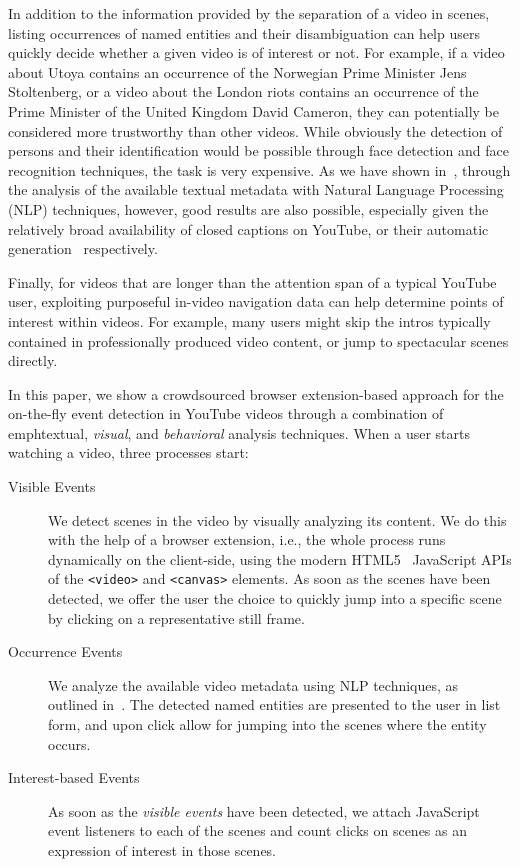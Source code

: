 \documentclass[runningheads,a4paper]{llncs}
\begin{document}
In addition to the information provided by the separation of a video in scenes, listing occurrences of named entities and their disambiguation can help users quickly decide whether a given video is of interest or not. For example, if a video about Utoya contains an occurrence of the Norwegian Prime Minister Jens Stoltenberg, or a video about the London riots contains an occurrence of the Prime Minister of the United Kingdom David Cameron, they can potentially be considered more trustworthy than other videos. While obviously the detection of persons and their identification would be possible through face detection and face recognition techniques, the task is very expensive. As we have shown in~\cite{semwebvid}, through the analysis of the available textual metadata with Natural Language Processing (NLP) techniques, however, good results are also possible, especially given the relatively broad availability of closed captions on YouTube, or their automatic generation~\cite{youtubecaptions} respectively.

Finally, for videos that are longer than the attention span of a typical YouTube user, exploiting purposeful in-video navigation data can help determine points of interest within videos. For example, many users might skip the intros typically contained in professionally produced video content, or jump to spectacular scenes directly. 

In this paper, we show a crowdsourced browser extension-based  approach for the on-the-fly event detection in YouTube videos through a combination of emph{textual}, \emph{visual}, and \emph{behavioral} analysis techniques. When a user starts watching a video, three processes start:
\begin{description}
\item[Visible Events] We detect scenes in the video by visually analyzing its content. We do this with the help of a browser extension, i.e., the whole process runs dynamically on the client-side, using the modern HTML5~\cite{w3c_html5} JavaScript APIs of the \texttt{<video>} and \texttt{<canvas>} elements. As soon as the scenes have been detected, we offer the user the choice to quickly jump into a specific scene by clicking on a representative still frame.
\item[Occurrence Events] We analyze the available video metadata using NLP techniques, as outlined in~\cite{semwebvid}. The detected named entities are presented to the user in list form, and upon click allow for jumping into the  scenes where the entity occurs.
\item[Interest-based Events] As soon as the \emph{visible events} have been detected, we attach JavaScript event listeners to each of the scenes and count clicks on scenes as an expression of interest in those scenes.
\end{description} 
 
\end{document}
